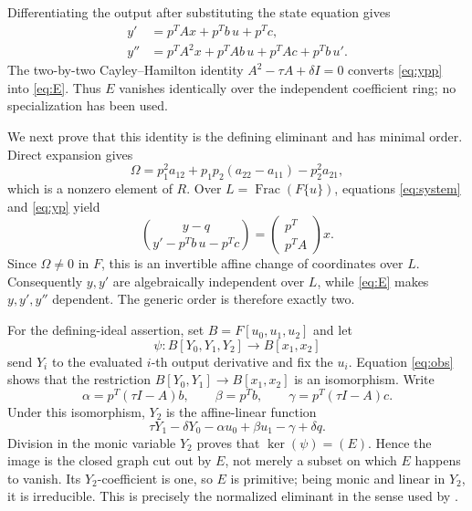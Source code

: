 \documentclass[11pt]{article}
\newcommand{\Frac}{\operatorname{Frac}}
\begin{document}
Differentiating the output after substituting the state equation gives
\begin{align}
 y'  &=p^TAx+p^Tb\,u+p^Tc,\label{eq:yp}\\
 y'' &=p^TA^2x+p^TAb\,u+p^TAc+p^Tb\,u'.\label{eq:ypp}
\end{align}
The two-by-two Cayley--Hamilton identity
\(A^2-\tau A+\delta I=0\) converts \eqref{eq:ypp} into
\eqref{eq:E}.  Thus \(E\) vanishes identically over the independent
coefficient ring; no specialization has been used.

We next prove that this identity is the defining eliminant and has minimal
order.  Direct expansion gives
\begin{equation}\label{eq:omega}
 \Omega=p_1^2a_{12}+p_1p_2(a_{22}-a_{11})-p_2^2a_{21},
\end{equation}
which is a nonzero element of \(R\).  Over
\(L=\Frac(F\{u\})\), equations \eqref{eq:system} and \eqref{eq:yp} yield
\begin{equation}\label{eq:obs}
 \binom{y-q}{y'-p^Tb\,u-p^Tc}
 =\begin{pmatrix}p^T\\p^TA\end{pmatrix}x.
\end{equation}
Since \(\Omega\ne0\) in \(F\), this is an invertible affine change of
coordinates over \(L\).  Consequently \(y,y'\) are algebraically independent
over \(L\), while \eqref{eq:E} makes \(y,y',y''\) dependent.  The generic
order is therefore exactly two.

For the defining-ideal assertion, set \(B=F[u_0,u_1,u_2]\) and let
\[
 \psi:B[Y_0,Y_1,Y_2]\longrightarrow B[x_1,x_2]
\]
send \(Y_i\) to the evaluated \(i\)-th output derivative and fix the
\(u_i\).  Equation \eqref{eq:obs} shows that the restriction
\(B[Y_0,Y_1]\to B[x_1,x_2]\) is an isomorphism.  Write
\[
 \alpha=p^T(\tau I-A)b,\qquad \beta=p^Tb,\qquad
 \gamma=p^T(\tau I-A)c.
\]
Under this isomorphism, \(Y_2\) is the affine-linear function
\[
 \tau Y_1-\delta Y_0-\alpha u_0+\beta u_1-\gamma+\delta q.
\]
Division in the monic variable \(Y_2\) proves that
\(\ker(\psi)=(E)\).  Hence the image is the closed graph cut out by
\(E\), not merely a subset on which \(E\) happens to vanish.  Its
\(Y_2\)-coefficient is one, so \(E\) is primitive; being monic and linear in
\(Y_2\), it is irreducible.  This is precisely the normalized eliminant in
the sense used by \cite{JeronimoLanciano2026}.
\end{document}
